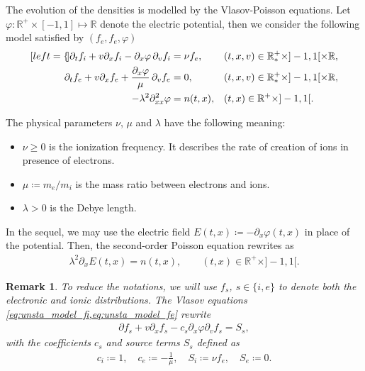 \documentclass{article}
\newtheorem{remarque}{Remark}[section]
\numberwithin{equation}{section}
\newcommand{\R}{\mathbb{R}}
\newcommand{\mysubeq}[2]{ %
	\begin{subequations}\label{#1}
		\begin{align}[left = {\empheqlbrace}]
			#2
		\end{align}
	\end{subequations}	
}
\begin{document}
The evolution of the densities is modelled by the Vlasov-Poisson equations. Let $\varphi : \R^+ \times [-1,1] \mapsto \R$ denote the electric potential, then we consider the following model satisfied by $(f_e, f_e, \varphi)$ 
\mysubeq{eq:unsta_model}{
	\partial_t f_i + v \partial_x f_i - \partial_x \varphi \, \partial_v f_i &= \nu f_e, && (t,x,v) \in \R_{*}^{+} \times ]-1,1[ \times \R, \label{eq:unsta_model_fi} \\
	\partial_t f_e + v \partial_x f_e + \frac{\partial_x \varphi }{\mu}\, \partial_v f_e &= 0, \quad\quad && (t,x,v) \in \R_{*}^{+} \times ]-1,1[ \times \R, \label{eq:unsta_model_fe} \\
	- \lambda^2 \partial^2_{xx} \varphi &= n (t,x), && (t,x) \in \R^{+} \times ]-1,1[. \label{eq:unsta_model_phi}
}
The physical parameters $\nu$, $\mu$ and $\lambda$ have the following meaning:
\begin{itemize}
\item $\nu \geqslant 0$ is the ionization frequency. It describes the rate of creation %
of ions in presence of electrons.
\item $\mu \coloneqq m_e / m_i$ is the mass ratio between electrons and ions.
\item $\lambda > 0$ is the Debye length.
\end{itemize}
In the sequel, we may use the electric field $E(t,x) \coloneqq - \partial_x \varphi(t,x)$ in place of the potential. Then, the second-order Poisson equation rewrites as 
\begin{align}
	\lambda^2 \partial_x E (t,x) = n(t,x), \quad \quad (t,x) \in \R^{+} \times ]-1,1[. \label{eq:unsta_model_E}
\end{align}

\begin{remarque}
	To reduce the notations, we will use $f_s$, $s\in\{i,e\}$ to denote both the electronic and ionic distributions. The Vlasov equations \cref{eq:unsta_model_fi,eq:unsta_model_fe} rewrite 
	\begin{align*}
		\partial f_s + v \partial_x f_s - c_s \partial_x \varphi \partial_v f_s = S_s,
	\end{align*}
	with the coefficients $c_s$ and source terms $S_s$ defined as
	\begin{align*}
		c_i \coloneqq 1, \quad c_e \coloneqq -\frac{1}{\mu}, \quad S_i \coloneqq \nu f_e, \quad S_e \coloneqq 0.
	\end{align*}
\end{remarque}
\end{document}
